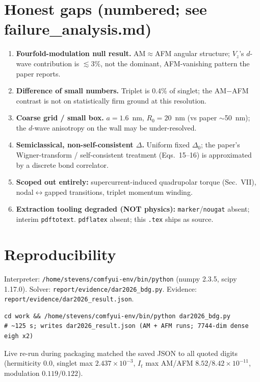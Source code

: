 \documentclass[11pt]{article}
\begin{document}
\section{Honest gaps (numbered; see failure\_analysis.md)}
\begin{enumerate}
\item \textbf{Fourfold-modulation null result.} AM$\approx$AFM angular structure;
$V_z$'s $d$-wave contribution is $\lesssim3\%$, not the dominant, AFM-vanishing
pattern the paper reports.
\item \textbf{Difference of small numbers.} Triplet is $0.4\%$ of singlet; the
AM$-$AFM contrast is not on statistically firm ground at this resolution.
\item \textbf{Coarse grid / small box.} $a=1.6$~nm, $R_0=20$~nm (vs paper
$\sim$50~nm); the $d$-wave anisotropy on the wall may be under-resolved.
\item \textbf{Semiclassical, non-self-consistent $\Delta$.} Uniform fixed $\Delta_0$;
the paper's Wigner-transform / self-consistent treatment (Eqs.~15--16) is
approximated by a discrete bond correlator.
\item \textbf{Scoped out entirely:} supercurrent-induced quadrupolar torque
(Sec.~VII), nodal$\leftrightarrow$gapped transitions, triplet momentum winding.
\item \textbf{Extraction tooling degraded (NOT physics):} \texttt{marker}/\texttt{nougat}
absent; interim \texttt{pdftotext}. \texttt{pdflatex} absent; this \texttt{.tex}
ships as source.
\end{enumerate}

\section{Reproducibility}
Interpreter: \texttt{/home/stevens/comfyui-env/bin/python} (numpy 2.3.5, scipy 1.17.0).
Solver: \texttt{report/evidence/dar2026\_bdg.py}. Evidence:
\texttt{report/evidence/dar2026\_result.json}.
\begin{verbatim}
cd work && /home/stevens/comfyui-env/bin/python dar2026_bdg.py
# ~125 s; writes dar2026_result.json (AM + AFM runs; 7744-dim dense eigh x2)
\end{verbatim}
Live re-run during packaging matched the saved JSON to all quoted digits
(hermiticity $0.0$, singlet max $2.437\times10^{-3}$, $I_t$ max AM/AFM
$8.52/8.42\times10^{-11}$, modulation $0.119/0.122$).
\end{document}
